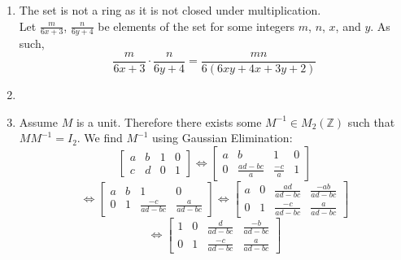 \documentclass{article}
\begin{document}
\begin{enumerate}
\item The set is not a ring as it is not closed under multiplication.\\
Let $\frac{m}{6x+3}$, $\frac{n}{6y+4}$ be elements of the set for some integers
$m$, $n$, $x$, and $y$.  As such,
\[
\frac{m}{6x+3}\cdot\frac{n}{6y+4} = \frac{mn}{6(6xy+4x+3y+2)}
\]

\item 

\item Assume $M$ is a unit.  Therefore there exists some $M^{-1} \in M_2(\mathbb{Z})$
such that $MM^{-1} = I_2$.  We find $M^{-1}$ using Gaussian Elimination:
\[
\left[
\begin{array}{cc|cc}
a & b & 1 & 0 \\
c & d & 0 & 1
\end{array}
\right]
\Leftrightarrow
\left[
\begin{array}{cc|cc}
a & b & 1 & 0 \\
0 & \frac{ad-bc}{a} & \frac{-c}{a} & 1
\end{array}
\right]
\]
\[
\Leftrightarrow
\left[
\begin{array}{cc|cc}
a & b & 1 & 0 \\
0 & 1 & \frac{-c}{ad-bc} & \frac{a}{ad-bc}
\end{array}
\right]
\Leftrightarrow
\left[
\begin{array}{cc|cc}
a & 0 & \frac{ad}{ad-bc} & \frac{-ab}{ad-bc} \\
0 & 1 & \frac{-c}{ad-bc} & \frac{a}{ad-bc}
\end{array}
\right]
\]
\[
\Leftrightarrow
\left[
\begin{array}{cc|cc}
1 & 0 & \frac{d}{ad-bc} & \frac{-b}{ad-bc} \\
0 & 1 & \frac{-c}{ad-bc} & \frac{a}{ad-bc}
\end{array}
\right]
\]


\end{enumerate}
\end{document}
